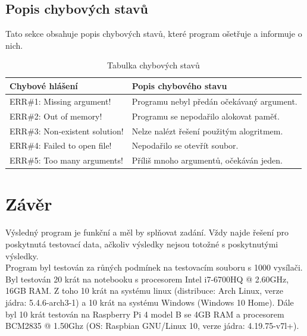 \documentclass[12pt]{article}
\begin{document}
\subsection{Popis chybových stavů}
Tato sekce obsahuje popis chybových stavů, které program ošetřuje a informuje
o nich.
%
\begin{table}[H]
        \begin{tabular}{|l|p{6.35cm}|}
                \hline
                \bf Chybové hlášení & \bf Popis chybového stavu \\
                \hline
                ERR\#1: Missing argument! & Programu nebyl předán očekávaný
		argument.\\
		\hline
                ERR\#2: Out of memory! & Programu se nepodařilo alokovat
		paměť.\\
                \hline
                ERR\#3: Non-existent solution! & Nelze nalézt řešení použitým
		alogritmem.\\
                \hline
                ERR\#4: Failed to open file! & Nepodařilo se otevřít soubor.\\
                \hline
                ERR\#5: Too many arguments! & Příliš mnoho argumentů, očekáván
		jeden.\\
                \hline
        \end{tabular}
        \caption{Tabulka chybových stavů}
        \label{tab:err}
\end{table}
%
%
\section{Závěr}
%
Výsledný program je funkční a měl by splňovat zadání. Vždy najde řešení pro
poskytnutá testovací data, ačkoliv výsledky nejsou totožné s poskytnutými
výsledky.\\

Program byl testován za růných podmínek na testovacím souboru s 1000 vysílači.
Byl testován 20 krát na notebooku s 
procesorem Intel i7-6700HQ @ 2.60GHz, 16GB RAM. Z toho 10 krát na systému linux
(distribuce: Arch Linux, verze jádra: 5.4.6-arch3-1) a 10 krát na systému
Windows (Windows 10 Home). Dále byl 10 krát testován na Raspberry Pi 4 model B
se 4GB RAM a 
procesorem BCM2835 @ 1.50Ghz (OS: Raspbian GNU/Linux 10,
verze jádra: 4.19.75-v7l+).\\
\end{document}

